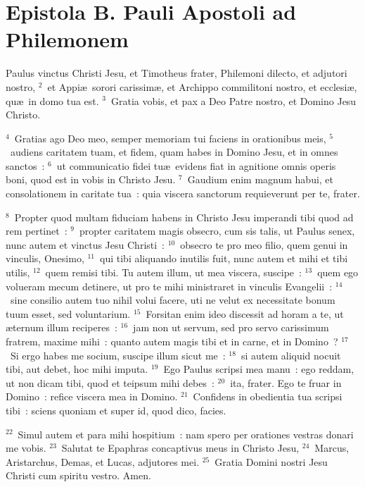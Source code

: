 \clearpage
{\centering \section*{Epistola B. Pauli Apostoli ad Philemonem}}\thispagestyle{empty}

\noindent Paulus vinctus Christi Jesu, et Timotheus frater, Philemoni dilecto, et adjutori nostro,
${}^{2}$~et Appi\ae\ sorori carissim\ae , et Archippo commilitoni nostro, et ecclesi\ae , qu\ae\ in domo tua est.
${}^{3}$~Gratia vobis, et pax a Deo Patre nostro, et Domino Jesu Christo.


${}^{4}$~Gratias ago Deo meo, semper memoriam tui faciens in orationibus meis,
${}^{5}$~audiens caritatem tuam, et fidem, quam habes in Domino Jesu, et in omnes sanctos~:
${}^{6}$~ut communicatio fidei tu\ae\ evidens fiat in agnitione omnis operis boni, quod est in vobis in Christo Jesu.
${}^{7}$~Gaudium enim magnum habui, et consolationem in caritate tua~: quia viscera sanctorum requieverunt per te, frater.


${}^{8}$~Propter quod multam fiduciam habens in Christo Jesu imperandi tibi quod ad rem pertinet~:
${}^{9}$~propter caritatem magis obsecro, cum sis talis, ut Paulus senex, nunc autem et vinctus Jesu Christi~:
${}^{10}$~obsecro te pro meo filio, quem genui in vinculis, Onesimo,
${}^{11}$~qui tibi aliquando inutilis fuit, nunc autem et mihi et tibi utilis,
${}^{12}$~quem remisi tibi. Tu autem illum, ut mea viscera, suscipe~:
${}^{13}$~quem ego volueram mecum detinere, ut pro te mihi ministraret in vinculis Evangelii~:
${}^{14}$~sine consilio autem tuo nihil volui facere, uti ne velut ex necessitate bonum tuum esset, sed voluntarium.
${}^{15}$~Forsitan enim ideo discessit ad horam a te, ut \ae ternum illum reciperes~:
${}^{16}$~jam non ut servum, sed pro servo carissimum fratrem, maxime mihi~: quanto autem magis tibi et in carne, et in Domino~?
${}^{17}$~Si ergo habes me socium, suscipe illum sicut me~:
${}^{18}$~si autem aliquid nocuit tibi, aut debet, hoc mihi imputa.
${}^{19}$~Ego Paulus scripsi mea manu~: ego reddam, ut non dicam tibi, quod et teipsum mihi debes~:
${}^{20}$~ita, frater. Ego te fruar in Domino~: refice viscera mea in Domino.
${}^{21}$~Confidens in obedientia tua scripsi tibi~: sciens quoniam et super id, quod dico, facies.


${}^{22}$~Simul autem et para mihi hospitium~: nam spero per orationes vestras donari me vobis.
${}^{23}$~Salutat te Epaphras concaptivus meus in Christo Jesu,
${}^{24}$~Marcus, Aristarchus, Demas, et Lucas, adjutores mei.
${}^{25}$~Gratia Domini nostri Jesu Christi cum spiritu vestro. Amen.
